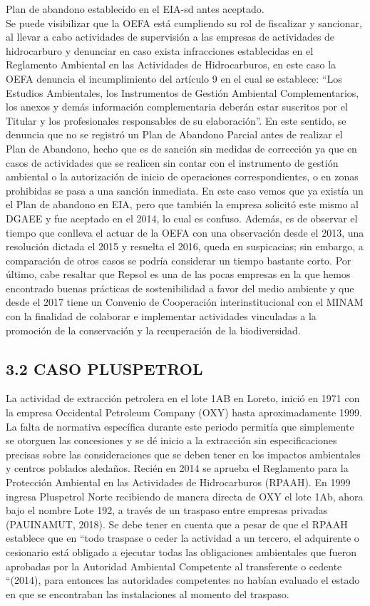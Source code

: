 \documentclass[12pt, a4paper]{article} %
\begin{document}
\begin{multicols}{2}
Plan de abandono establecido en el EIA-sd antes aceptado.\\Se puede visibilizar que la OEFA está cumpliendo su rol de fiscalizar y sancionar, al llevar a cabo actividades de supervisión a las empresas de actividades de hidrocarburo y denunciar en caso exista infracciones establecidas en el Reglamento Ambiental en las Actividades de Hidrocarburos, en este caso la OEFA denuncia el incumplimiento del artículo 9 en el cual se establece: “Los Estudios Ambientales, los Instrumentos de Gestión Ambiental Complementarios, los anexos y demás información complementaria deberán estar suscritos por el Titular y los profesionales responsables de su elaboración”. En este sentido, se denuncia que no se registró un Plan de Abandono Parcial antes de realizar el Plan de Abandono, hecho que es de sanción sin medidas de corrección ya que en casos de actividades que se realicen sin contar con el instrumento de gestión ambiental o la autorización de inicio de operaciones correspondientes, o en zonas prohibidas se pasa a una sanción inmediata. En este caso vemos que ya existía un el Plan de abandono en EIA, pero que también la empresa solicitó este mismo al DGAEE y fue aceptado en el 2014, lo cual es confuso. Además, es de observar el tiempo que conlleva el actuar de la OEFA con una observación desde el 2013, una resolución dictada el 2015 y resuelta el 2016, queda en suspicacias; sin embargo, a comparación de otros casos se podría considerar un tiempo bastante corto. Por último, cabe resaltar que Repsol es una de las pocas empresas en la que hemos encontrado buenas prácticas de sostenibilidad a favor del medio ambiente y que desde el 2017 tiene un Convenio de Cooperación interinstitucional con el MINAM con la finalidad de colaborar e implementar actividades vinculadas a la promoción de la conservación y la recuperación de la biodiversidad.
            \subsection*{3.2 CASO PLUSPETROL}
            La actividad de extracción petrolera en el lote 1AB en Loreto, inició en 1971 con la empresa Occidental Petroleum Company (OXY) hasta aproximadamente 1999. La falta de normativa específica durante este periodo permitía que simplemente se otorguen las concesiones y se dé inicio a la extracción sin especificaciones precisas sobre las consideraciones que se deben tener en los impactos ambientales y centros poblados aledaños. Recién en 2014 se aprueba el Reglamento para la Protección Ambiental en las Actividades de Hidrocarburos (RPAAH). En 1999 ingresa Pluspetrol Norte recibiendo de manera directa de OXY el lote 1Ab, ahora bajo el nombre Lote 192, a través de un traspaso entre empresas privadas (PAUINAMUT, 2018). Se debe tener en cuenta que a pesar de que el RPAAH establece que en “todo traspase o ceder la actividad a un tercero, el adquirente o cesionario está obligado a ejecutar todas las obligaciones ambientales que fueron aprobadas por la Autoridad Ambiental Competente al transferente o cedente “(2014), para entonces las autoridades competentes no habían evaluado el estado en que se encontraban las instalaciones al momento del traspaso.
            

\end{multicols}
\end{document}
